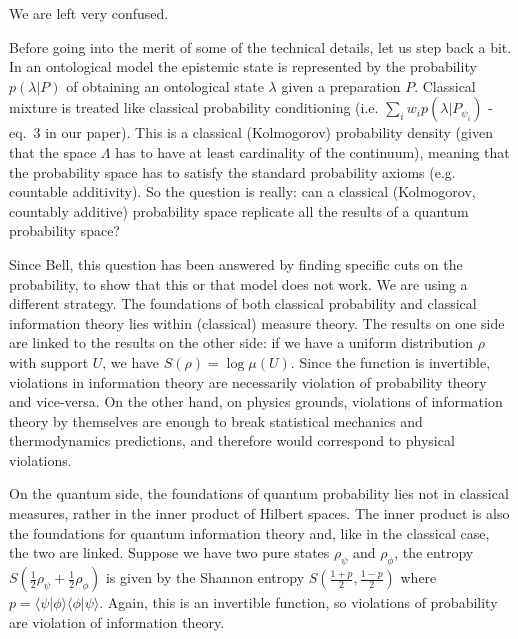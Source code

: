 \documentclass[11pt]{article}
\def\>{\rangle}
\def\<{\langle}
\begin{document}
	We are left very confused.
	
	
	Before going into the merit of some of the technical details, let us step back a bit. In an ontological model the epistemic state is represented by the probability $p(\lambda | P)$ of obtaining an ontological state $\lambda$ given a preparation $P$. Classical mixture is treated like classical probability conditioning (i.e. $\sum_i  w_i p(\lambda| P_{\psi_i})$ - eq.~3 in our paper). This is a classical (Kolmogorov) probability density (given that the space $\Lambda$ has to have at least cardinality of the continuum), meaning that the probability space has to satisfy the standard probability axioms (e.g. countable additivity). So the question is really: can a classical (Kolmogorov, countably additive) probability space replicate all the results of a quantum probability space?
	
	Since Bell, this question has been answered by finding specific cuts on the probability, to show that this or that model does not work. We are using a different strategy. The foundations of both classical probability and classical information theory lies within (classical) measure theory. The results on one side are linked to the results on the other side: if we have a uniform distribution $\rho$ with support $U$, we have $S(\rho) = \log \mu(U)$. Since the function is invertible, violations in information theory are necessarily violation of probability theory and vice-versa. On the other hand, on physics grounds, violations of information theory by themselves are enough to break statistical mechanics and thermodynamics predictions, and therefore would correspond to physical violations.
	
	On the quantum side, the foundations of quantum probability lies not in classical measures, rather in the inner product of Hilbert spaces. The inner product is also the foundations for quantum information theory and, like in the classical case, the two are linked. Suppose we have two pure states $\rho_\psi$ and $\rho_\phi$, the entropy $S(\frac{1}{2} \rho_\psi + \frac{1}{2} \rho_\phi)$ is given by the Shannon entropy $S(\frac{1+p}{2}, \frac{1-p}{2})$ where $p=\<\psi | \phi \>\<\phi | \psi\>$. Again, this is an invertible function, so violations of probability are violation of information theory.
	
\end{document}
